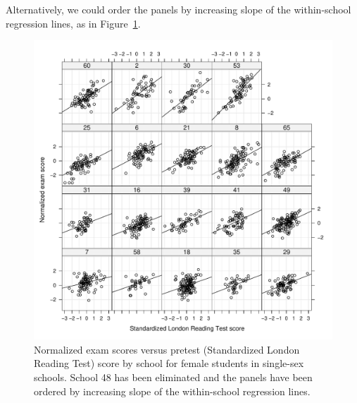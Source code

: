 \documentclass[12pt]{article}
\begin{document}
Alternatively, we could order the panels by increasing slope of the
within-school regression lines, as in Figure~\ref{fig:Examplot4a}.
\begin{figure}[tbp]
  \centering
  \includegraphics[width=\textwidth]{figs/SoftRev-Examplot4a}
  \caption{Normalized exam scores versus pretest (Standardized London
    Reading Test) score by school for female students in single-sex
    schools. School 48 has been eliminated and the panels have been
    ordered by increasing slope of the within-school regression
    lines.}
  \label{fig:Examplot4a}
\end{figure}
\end{document}
